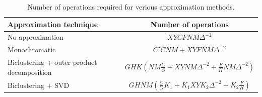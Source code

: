\begin{table}[t]
\tiny
\centering
\begin{tabular}{lc}
\hline
Approximation technique & Number of operations \\
\hline
No approximation & $X Y C F N M \Delta^{-2}$\\
Monochromatic & $C' C N M + X Y F N M \Delta^{-2}$\\
Biclustering + outer product decomposition & $G H K (N M \frac{C}{G} + X Y N M \Delta^{-2} + \frac{F}{H} N M \Delta^{-2})$ \\  
Biclustering + SVD & $G H N M (\frac{C}{G}K_1 + K_1 X Y K_2 \Delta^{-2} + K_2\frac{F}{H})$\\
\end{tabular}
\caption{Number of operations required for verious approximation methods.} 
\label{table:ops}
\end{table}


